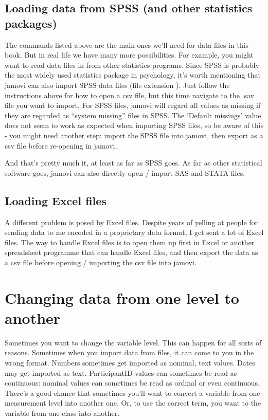 \subsection{Loading data from SPSS (and other statistics packages)}

The commands listed above are the main ones we'll need for data files in this book. But in real life we have many more possibilities. For example, you might want to read data files in from other statistics programs. Since SPSS is probably the most widely used statistics package in psychology, it's worth mentioning that jamovi can also import SPSS data files (file extension ). Just follow the instructions above for how to open a csv file, but this time navigate to the .sav file you want to import. For SPSS files, jamovi will regard all values as missing if they are regarded as ``system missing'' files in SPSS. The `Default missings' value does not seem to work as expected when importing SPSS files, so be aware of this - you might need another step: import the SPSS file into jamovi, then export as a csv file before re-opening in jamovi..

And that's pretty much it, at least as far as SPSS goes.  As far as other statistical software goes, jamovi can also directly open / import SAS and STATA files. 

\subsection{Loading Excel files} 

A different problem is posed by Excel files. Despite years of yelling at people for sending data to me encoded in a proprietary data format, I get sent a lot of Excel files. The way to handle Excel files is to open them up first in Excel or another spreadsheet programme that can handle Excel files, and then export the data as a csv file before opening / importing the csv file into jamovi. 


\section{Changing data from one level to another\label{sec:coercion}}

Sometimes you want to change the variable level. This can happen for all sorts of reasons. Sometimes when you import data from files, it can come to you in the wrong format. Numbers sometimes get imported as nominal, text values. Dates may get imported as text. ParticipantID values can sometimes be read as continuous: nominal values can sometimes be read as ordinal or even continuous. There's a good chance that sometimes you'll want to convert a variable from one measurement level into another one. Or, to use the correct term, you want to  the variable from one class into another. 

